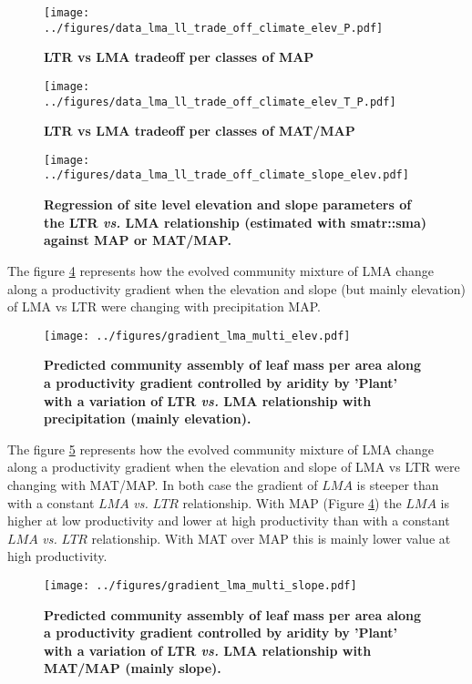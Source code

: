\documentclass[a4paper,11pt]{article}
\begin{document}
\begin{figure}[ht]
\centering
\texttt{[image: ../figures/data\_lma\_ll\_trade\_off\_climate\_elev\_P.pdf]}
\caption{\textbf{LTR vs LMA tradeoff per classes of MAP}
\label{fig:MAP}}
\end{figure}


\begin{figure}[ht]
\centering
\texttt{[image: ../figures/data\_lma\_ll\_trade\_off\_climate\_elev\_T\_P.pdf]}
\caption{\textbf{LTR vs LMA tradeoff per classes of MAT/MAP}
\label{fig:MAT_MAP}}
\end{figure}


\begin{figure}[ht]
\centering
\texttt{[image: ../figures/data\_lma\_ll\_trade\_off\_climate\_slope\_elev.pdf]}
\caption{\textbf{Regression of site level elevation and slope parameters of the LTR \textit{vs.} LMA relationship (estimated with smatr::sma) against MAP or MAT/MAP. }
\label{fig:elev_slope}}
\end{figure}


The figure \ref{fig:lma_map} represents how the evolved community
mixture of LMA change along a productivity gradient when the elevation
and slope (but mainly elevation) of LMA vs LTR were changing with
precipitation MAP.

\begin{figure}[ht]
\centering
\texttt{[image: ../figures/gradient\_lma\_multi\_elev.pdf]}
\caption{\textbf{Predicted community assembly of leaf mass per area
    along a productivity gradient controlled by aridity by 'Plant'
    with a variation of LTR \textit{vs.} LMA relationship with precipitation (mainly elevation).}
\label{fig:lma_map}}
\end{figure}

The figure \ref{fig:lma_mat_o_map} represents how the evolved
community mixture of LMA change along a productivity gradient when the
elevation and slope of LMA vs LTR were changing with MAT/MAP. In both case the gradient of $LMA$ is steeper than
with a constant $LMA$ \textit{vs.} $LTR$ relationship. With MAP (Figure \ref{fig:lma_map}) the $LMA$ is
higher at low productivity and lower at high productivity than with a
constant $LMA$ \textit{vs.} $LTR$ relationship. With MAT over MAP this
is mainly lower value at high productivity.

\begin{figure}[ht]
\centering
\texttt{[image: ../figures/gradient\_lma\_multi\_slope.pdf]}
\caption{\textbf{Predicted community assembly of leaf mass per area
    along a productivity gradient controlled by aridity by 'Plant'
    with a variation of LTR \textit{vs.} LMA relationship with MAT/MAP
    (mainly slope).}
\label{fig:lma_mat_o_map}}
\end{figure}
\end{document}
